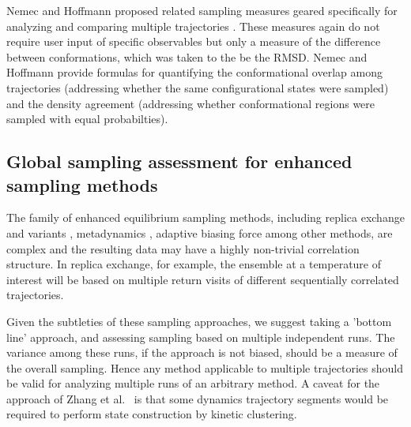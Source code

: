Nemec and Hoffmann proposed related sampling measures geared specifically for analyzing and comparing multiple trajectories \cite{Nemec2017}.
These measures again do not require user input of specific observables but only a measure of the difference between conformations, which was taken to the be the RMSD.
Nemec and Hoffmann provide formulas for quantifying the conformational overlap among trajectories (addressing whether the same configurational states were sampled) and the density agreement (addressing whether conformational regions were  sampled with equal probabilties).


\subsection{Global sampling assessment for enhanced sampling methods}
The family of enhanced equilibrium sampling methods, including replica exchange and variants \cite{Swendsen-1986,Sugita1999,Okamoto-2000}, metadynamics \cite{Bussi2006a,Laio2008}, adaptive biasing force \cite{Darve2001,Darve2008,Comer2015} among other methods, are complex and the resulting data may have a highly non-trivial correlation structure.
In replica exchange, for example, the ensemble at a temperature of interest will be based on multiple return visits of different sequentially correlated trajectories.

Given the subtleties of these sampling approaches, we suggest taking a 'bottom line' approach, and assessing sampling based on multiple independent runs.
The variance among these runs, if the approach is not biased, should be a measure of the overall sampling.
Hence any method applicable to multiple trajectories should be valid for analyzing multiple runs of an arbitrary method.
A caveat for the approach of Zhang et al.\ \cite{Zhang2010} is that some dynamics trajectory segments would be required to perform state construction by kinetic clustering.
